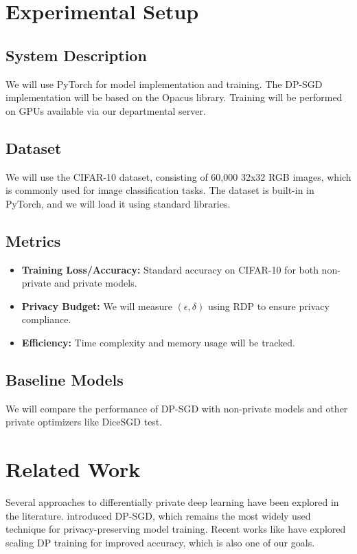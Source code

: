 \documentclass{article}
\begin{document}
    \section{Experimental Setup}\label{sec:experimental-setup}

    \subsection{System Description}\label{subsec:system-description}
    We will use PyTorch for model implementation and training.
    The DP-SGD implementation will be based on the Opacus library.
    Training will be performed on GPUs available via our departmental server.

    \subsection{Dataset}\label{subsec:dataset}
    We will use the CIFAR-10 dataset, consisting of 60,000 32x32 RGB images, which is commonly used for
    image classification tasks.
    The dataset is built-in in PyTorch, and we will load it using standard libraries.

    \subsection{Metrics}\label{subsec:metrics}
    \begin{itemize}
        \item \textbf{Training Loss/Accuracy:} Standard accuracy on CIFAR-10 for both non-private and private models.
        \item \textbf{Privacy Budget:} We will measure $(\epsilon, \delta)$ using RDP to ensure privacy compliance.
        \item \textbf{Efficiency:} Time complexity and memory usage will be tracked.
    \end{itemize}

    \subsection{Baseline Models}\label{subsec:baseline-models}
    We will compare the performance of DP-SGD with non-private models and other private optimizers like DiceSGD test.


    \section{Related Work}\label{sec:related-work}
    Several approaches to differentially private deep learning have been explored in the literature. \citet{abadi2016deep} introduced DP-SGD, which remains the most widely used technique for privacy-preserving model training. Recent works like \citet{de2022unlocking} have explored scaling DP training for improved accuracy, which is also one of our goals.
\end{document}
